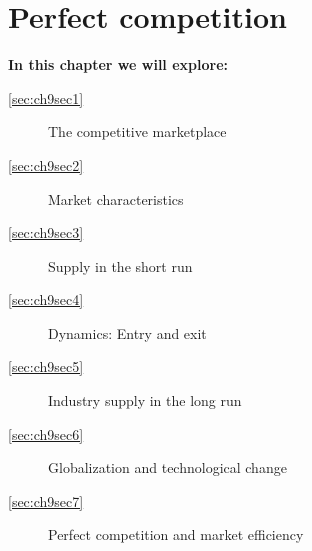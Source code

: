 \chapter{Perfect competition}\label{chap:perfectcompetition}

\begin{topics}
	\textbf{In this chapter we will explore:}
	\begin{description}
		\item[\ref{sec:ch9sec1}] The competitive marketplace
		\item[\ref{sec:ch9sec2}] Market characteristics
		\item[\ref{sec:ch9sec3}] Supply in the short run
		\item[\ref{sec:ch9sec4}] Dynamics: Entry and exit
		\item[\ref{sec:ch9sec5}] Industry supply in the long run
		\item[\ref{sec:ch9sec6}] Globalization and technological change
		\item[\ref{sec:ch9sec7}] Perfect competition and market efficiency
	\end{description}
\end{topics}